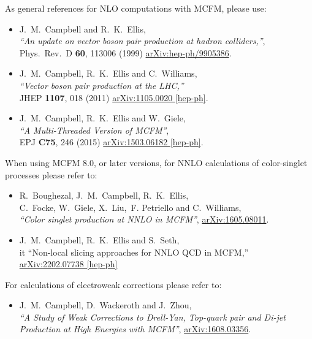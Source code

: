 \label{MCFMrefs}

As general references for NLO computations with MCFM, please use:
\begin{itemize}
\item J.~M.~Campbell and R.~K.~Ellis, \\
  {\it ``An update on vector boson pair production at hadron colliders,''}, \\
  Phys.\ Rev.\ D {\bf 60}, 113006 (1999)
  \href{https://arxiv.org/abs/hep-ph/9905386}{arXiv:hep-ph/9905386}.
%
\item J.~M.~Campbell, R.~K.~Ellis and C.~Williams, \\
  {\it ``Vector boson pair production at the LHC,''} \\
  JHEP {\bf 1107}, 018 (2011)
  \href{https://arxiv.org/abs/1105.0020}{arXiv:1105.0020 [hep-ph]}. 
%
\item J.~M.~Campbell, R.~K.~Ellis and W.~Giele, \\
  {\it ``A Multi-Threaded Version of MCFM''}, \\
    EPJ {\bf C75}, 246 (2015)
    \href{https://arxiv.org/abs/1503.06182}{arXiv:1503.06182 [hep-ph]}.

\end{itemize}

When using MCFM 8.0, or later versions, for NNLO calculations of color-singlet
processes please refer to:
\begin{itemize}
\item R.~Boughezal, J.~M.~Campbell, R.~K.~Ellis, \\
   C.~Focke, W.~Giele, X.~Liu,~F. Petriello and  C.~Williams, \\
  {\it ``Color singlet production at NNLO in MCFM''},
  \href{https://arxiv.org/abs/1605.08011}{arXiv:1605.08011}.
%
\item J.~M.~Campbell, R.~K.~Ellis and S.~Seth, \\
{it ``Non-local slicing approaches for NNLO QCD in MCFM,''}
\href{https://arxiv.org/abs/2202.07738}{arXiv:2202.07738 [hep-ph]}
\end{itemize}

For calculations of electroweak corrections please refer to:
\begin{itemize}
\item   J.~M.~Campbell, D.~Wackeroth and J.~Zhou, \\
  {\it ``A Study of Weak Corrections to Drell-Yan, Top-quark pair and Di-jet
  Production at High Energies with MCFM''},
  \href{https://arxiv.org/abs/1608.03356}{arXiv:1608.03356}.
\end{itemize}

